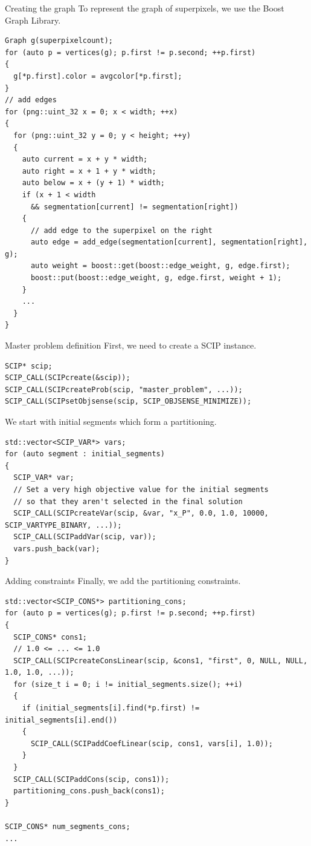 \documentclass[fleqn]{beamer}
\begin{document}
\begin{frame}[fragile]{Creating the graph}
To represent the graph of superpixels, we use the Boost Graph Library.

\begin{verbatim}
Graph g(superpixelcount);
for (auto p = vertices(g); p.first != p.second; ++p.first)
{
  g[*p.first].color = avgcolor[*p.first];
}	
// add edges
for (png::uint_32 x = 0; x < width; ++x)
{
  for (png::uint_32 y = 0; y < height; ++y)
  {
    auto current = x + y * width;
    auto right = x + 1 + y * width;
    auto below = x + (y + 1) * width;
    if (x + 1 < width
      && segmentation[current] != segmentation[right])
    {
      // add edge to the superpixel on the right
      auto edge = add_edge(segmentation[current], segmentation[right], g);
      auto weight = boost::get(boost::edge_weight, g, edge.first);
      boost::put(boost::edge_weight, g, edge.first, weight + 1);
    }
    ...
  }
}
\end{verbatim}
\end{frame}

\begin{frame}[fragile]{Master problem definition}
First, we need to create a SCIP instance.
\begin{verbatim}
SCIP* scip;
SCIP_CALL(SCIPcreate(&scip));
SCIP_CALL(SCIPcreateProb(scip, "master_problem", ...));
SCIP_CALL(SCIPsetObjsense(scip, SCIP_OBJSENSE_MINIMIZE));
\end{verbatim}

We start with initial segments which form a partitioning.
\begin{verbatim}
std::vector<SCIP_VAR*> vars;
for (auto segment : initial_segments)
{
  SCIP_VAR* var;
  // Set a very high objective value for the initial segments
  // so that they aren't selected in the final solution
  SCIP_CALL(SCIPcreateVar(scip, &var, "x_P", 0.0, 1.0, 10000, SCIP_VARTYPE_BINARY, ...));
  SCIP_CALL(SCIPaddVar(scip, var));
  vars.push_back(var);
}
\end{verbatim}
\end{frame}

\begin{frame}[fragile]{Adding constraints}
Finally, we add the partitioning constraints.
\begin{verbatim}
std::vector<SCIP_CONS*> partitioning_cons;
for (auto p = vertices(g); p.first != p.second; ++p.first)
{
  SCIP_CONS* cons1;
  // 1.0 <= ... <= 1.0
  SCIP_CALL(SCIPcreateConsLinear(scip, &cons1, "first", 0, NULL, NULL, 1.0, 1.0, ...));
  for (size_t i = 0; i != initial_segments.size(); ++i)
  {
    if (initial_segments[i].find(*p.first) != initial_segments[i].end())
    {
      SCIP_CALL(SCIPaddCoefLinear(scip, cons1, vars[i], 1.0));
    }
  }
  SCIP_CALL(SCIPaddCons(scip, cons1));
  partitioning_cons.push_back(cons1);
}

SCIP_CONS* num_segments_cons;
...
\end{verbatim}
\end{frame}
\end{document}
